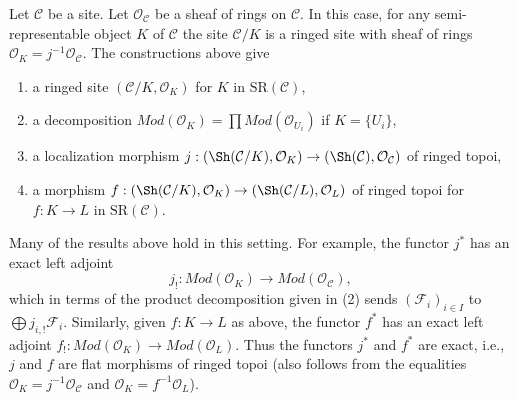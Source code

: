 \begin{remark}
\label{remark-semi-representable-ringed}
Let $\mathcal{C}$ be a site. Let $\mathcal{O}_\mathcal{C}$
be a sheaf of rings on $\mathcal{C}$. In this case, for any
semi-representable object $K$ of $\mathcal{C}$ the site
$\mathcal{C}/K$ is a ringed site with sheaf
of rings $\mathcal{O}_K = j^{-1}\mathcal{O}_\mathcal{C}$.
The constructions above give
\begin{enumerate}
\item a ringed site $(\mathcal{C}/K, \mathcal{O}_K)$
for $K$ in $\text{SR}(\mathcal{C})$,
\item a decomposition
$\textit{Mod}(\mathcal{O}_K) =
\prod \textit{Mod}(\mathcal{O}_{U_i})$ if $K = \{U_i\}$,
\item a localization morphism
$j : (\Sh(\mathcal{C}/K), \mathcal{O}_K) \to
(\Sh(\mathcal{C}), \mathcal{O}_\mathcal{C})$
of ringed topoi,
\item a morphism
$f : (\Sh(\mathcal{C}/K), \mathcal{O}_K) \to
(\Sh(\mathcal{C}/L), \mathcal{O}_L)$ of ringed topoi
for $f : K \to L$ in $\text{SR}(\mathcal{C})$.
\end{enumerate}
Many of the results above hold in this setting. For example, the
functor $j^*$ has an exact left adjoint
$$
j_! : \textit{Mod}(\mathcal{O}_K) \to \textit{Mod}(\mathcal{O}_\mathcal{C}),
$$
which in terms of the product decomposition given in (2) sends
$(\mathcal{F}_i)_{i \in I}$ to $\bigoplus j_{i, !}\mathcal{F}_i$.
Similarly, given $f : K \to L$ as above, the functor $f^*$ has
an exact left adjoint
$f_! : \textit{Mod}(\mathcal{O}_K) \to \textit{Mod}(\mathcal{O}_L)$.
Thus the functors $j^*$ and $f^*$ are exact, i.e.,
$j$ and $f$ are flat morphisms of ringed topoi (also follows
from the equalities $\mathcal{O}_K = j^{-1}\mathcal{O}_\mathcal{C}$
and $\mathcal{O}_K = f^{-1}\mathcal{O}_L$).
\end{remark}

